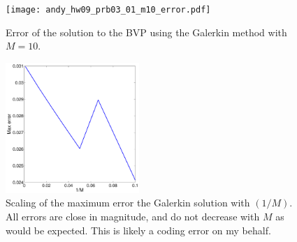 \documentclass[11pt]{article}
\begin{document}
\begin{enumerate}
\begin{figure}[h!]
  \centering
    \texttt{[image: andy\_hw09\_prb03\_01\_m10\_error.pdf]}
  \caption{Error of the solution to the BVP using the Galerkin method with $M=10$.}
\end{figure}

\begin{figure}[h!]
  \centering
    \includegraphics[width=0.45\textwidth]{andy_hw09_prb03_02.pdf}
  \caption{Scaling of the maximum error the Galerkin solution with $(1/M)$.
    All errors are close in magnitude, and do not decrease with $M$ as would be expected. This is likely a coding error on my behalf.}
\end{figure}

\end{enumerate}
\end{document}
